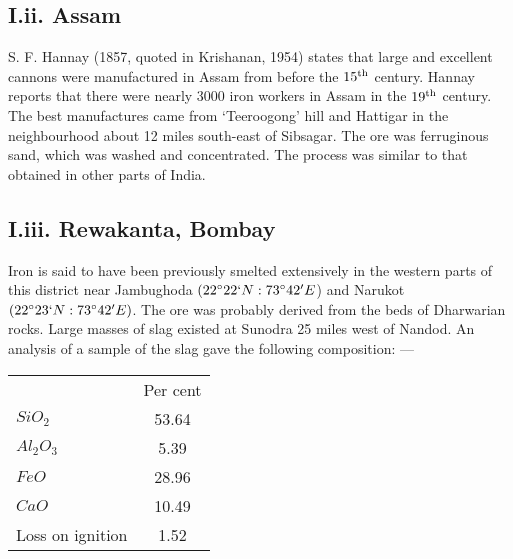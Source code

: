 \vspace{-.5cm}

\subsection*{I.ii. Assam}\label{subsection-2}

\vspace{-.3cm}

S. F. Hannay (1857, quoted in Krishanan, 1954) states that large and excellent cannons were manufactured in Assam from before the $15^{\rm th}$ century. Hannay reports that there were nearly 3000 iron workers in Assam in the $19^{\rm th}$ century. The best manufactures came from ‘Teeroogong’ hill and Hattigar in the neighbourhood about 12 miles south-east of Sibsagar. The ore was ferruginous sand, which was washed and concentrated. The process was similar to that obtained in other parts of India.

\vspace{-.3cm}

\subsection*{I.iii. Rewakanta, Bombay}\label{subsection-3}

\vspace{-.3cm}

Iron is said to have been previously smelted extensively in the western parts of this district near Jambughoda $(22^\circ 22`N: 73^\circ 42'E$) and Narukot $(22^\circ 23` N: 73^\circ 42' E)$. The ore was probably derived from the beds of Dharwarian rocks. Large masses of slag existed at Sunodra 25 miles west of Nandod. An analysis of a sample of the slag gave the following composition: —

\vspace{-.3cm}

\begin{center}
\begin{tabular}{lc}
& Per cent\\
$SiO_2$ & 53.64\\
$Al_2O_3$ & 5.39 \\
$FeO$ & 28.96\\
$CaO$ & 10.49\\
Loss on ignition & 1.52
\end{tabular}
\end{center}

\vspace{-.3cm}

